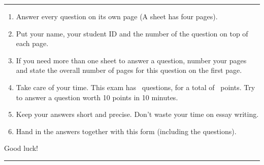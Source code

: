 \begin{coverpages}

\maketitle

\hrule

\vspace{3ex}

\begin{enumerate}
  \item Answer every question on its own page (A sheet has four pages).
  \item Put your name, your student ID and the number of the question on top of
  each page.
  \item If you need more than one sheet to answer a question, number your
  pages and state the overall number of pages for this question on the first
  page.
  \item Take care of your time. 
  This exam has \numquestions\ questions, for a total of \numpoints\ points.
  Try to answer a question worth 10 points in 10 minutes. 
  \item Keep your answers short and precise. 
  Don't waste your time on essay writing.
  \item Hand in the answers together with this form (including the questions).
\end{enumerate}

Good luck!

\vspace{5ex}

\hrule

\vspace{5ex}

\begin{center}
\hfill

\vfill
{}
\gradetable 
\end{center}
\thispagestyle{empty}

\cleardoublepage
{\ }
\end{coverpages}

